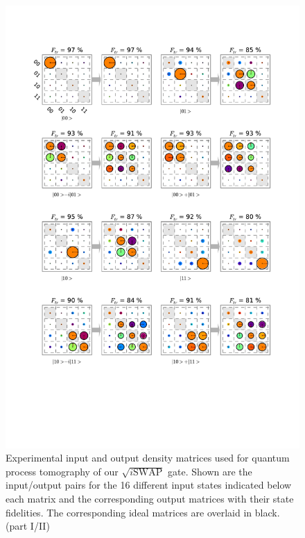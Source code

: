 \begin{figure}[p]
	\centering
		\includegraphics[width=1.0\textwidth]{"./data/ct5/2011_04_21 - grover and tomo/good_data/process -matrices 1"}
	\caption{Experimental input and output density matrices used for quantum process tomography of our $\sqrt{i\mathrm{SWAP}}$ gate. Shown are the input/output pairs for the 16 different input states indicated below each matrix and the corresponding output matrices with their state fidelities. The corresponding ideal matrices are overlaid in black. (part I/II)}
	\label{fig:process_matrices_1}
\end{figure}

